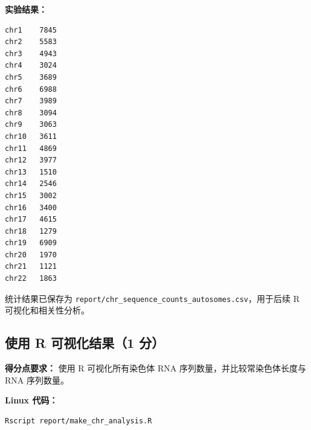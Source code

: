 \documentclass[12pt,a4paper,fontset=fandol]{ctexart}
\begin{document}
\noindent\textbf{实验结果：}
\begin{lstlisting}[style=resultcode]
chr1    7845
chr2    5583
chr3    4943
chr4    3024
chr5    3689
chr6    6988
chr7    3989
chr8    3094
chr9    3063
chr10   3611
chr11   4869
chr12   3977
chr13   1510
chr14   2546
chr15   3002
chr16   3400
chr17   4615
chr18   1279
chr19   6909
chr20   1970
chr21   1121
chr22   1863
\end{lstlisting}

统计结果已保存为 \texttt{report/chr\_sequence\_counts\_autosomes.csv}，用于后续 R 可视化和相关性分析。

\subsection{使用 R 可视化结果（1 分）}

\noindent\textbf{得分点要求：} 使用 R 可视化所有染色体 RNA 序列数量，并比较常染色体长度与 RNA 序列数量。

\noindent\textbf{Linux 代码：}
\begin{lstlisting}[style=linuxcode]
Rscript report/make_chr_analysis.R
\end{lstlisting}
\end{document}
